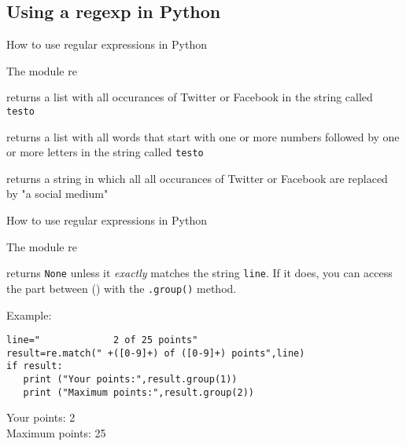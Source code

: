 \documentclass{beamer}
\begin{document}
\subsection{Using a regexp in Python}
\begin{frame}{How to use regular expressions in Python}
\begin{block}{The module re}
\begin{description}
\item<1->[{\tt{re.findall("\lbrack Tt\rbrack witter|\lbrack Ff\rbrack acebook",testo)}}] returns a list with all occurances of Twitter or Facebook in the string called {\tt{testo}}
\item<1->[{\tt{re.findall("\lbrack 0-9\rbrack +\lbrack a-zA-Z\rbrack +",testo)}}] returns a list with all words that start with one or more numbers followed by one or more letters in the string called {\tt{testo}}
\item<2->[{\tt{re.sub("\lbrack Tt\rbrack witter|\lbrack Ff\rbrack acebook","a social medium",testo)}}] returns a string in which all all occurances of Twitter or Facebook are replaced by "a social medium"
\end{description}
\end{block}
\end{frame}


\begin{frame}[fragile]{How to use regular expressions in Python}
\begin{block}{The module re}
\begin{description}
\item<1->[{\tt{re.match(" +(\lbrack 0-9\rbrack +) of (\lbrack 0-9\rbrack +) points",line)}}] returns  \texttt{None} unless it \emph{exactly} matches the string \texttt{line}. If it does, you can access the part between () with the \texttt{.group()} method.
\end{description}
\end{block}

Example:
\begin{lstlisting}
line="             2 of 25 points"
result=re.match(" +([0-9]+) of ([0-9]+) points",line)
if result:
   print ("Your points:",result.group(1))
   print ("Maximum points:",result.group(2))
\end{lstlisting}
Your points: 2\\
Maximum points: 25
\end{frame}
\end{document}
